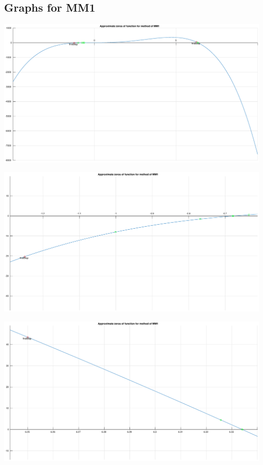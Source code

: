 \documentclass[12pt]{report}
\begin{document}
\subsection{Graphs for MM1}
\begin{center}
   \includegraphics[scale=0.25]{task2mm1realoverall.eps}
\end{center}

\begin{center}
   \includegraphics[scale=0.25]{task2mm1realleft.eps}
\end{center}

\begin{center}
   \includegraphics[scale=0.25]{task2mm1realright.eps}
\end{center}
\end{document}
